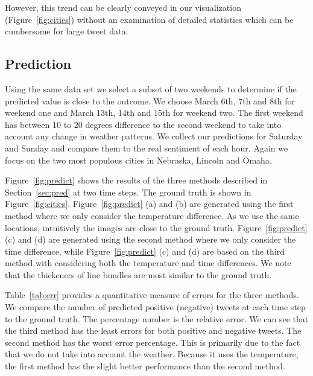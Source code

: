 However, this trend can be clearly conveyed in our visualization (Figure~\ref{fig:cities}) without an examination of detailed statistics which can be cumbersome for large tweet data.


\subsection{Prediction}
\label{sec:caseprediction}

Using the same data set we select a subset of two weekends to determine if the predicted value is close to the outcome. We choose March 6th, 7th and 8th for weekend one and March 13th, 14th and 15th for weekend two. The first weekend has between 10 to 20 degrees difference to the second weekend to take into account any change in weather patterns. We collect our predictions for Saturday and Sunday and compare them to the real sentiment of each hour. Again we focus on the two most populous cities in Nebraska, Lincoln and Omaha.

Figure~\ref{fig:predict} shows the results of the three methods described in Section~\ref{sec:pred} at two time steps. The ground truth is shown in Figure~\ref{fig:cities}. Figure~\ref{fig:predict} (a) and (b) are generated using the first method where we only consider the temperature difference. As we use the same locations, intuitively the images are close to the ground truth. Figure~\ref{fig:predict} (c) and (d) are generated using the second method where we only consider the time difference, while Figure~\ref{fig:predict} (c) and (d) are based on the third method with considering both the temperature and time differences. We note that the thickeners of line bundles are most similar to the ground truth. 

Table~\ref{tab:err} provides a quantitative measure of errors for the three methods. We compare the number of predicted positive (negative) tweets at each time step to the ground truth. The percentage number is the relative error. We can see that the third method has the least errors for both positive and negative tweets. The second method has the worst error percentage. This is primarily due to the fact that we do not take into account the weather. Because it uses the temperature, the first method has the slight better performance than the second method.

